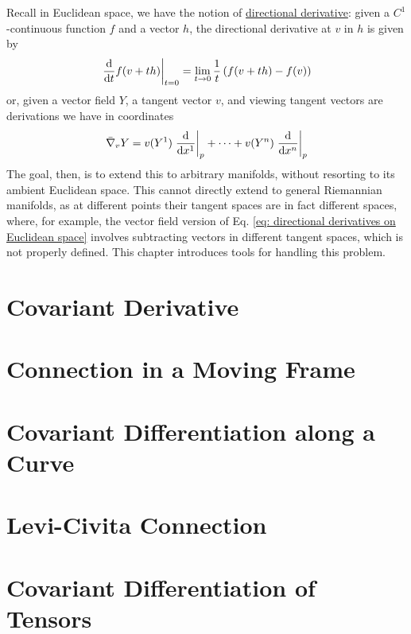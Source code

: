 \documentclass{article}
\begin{document}

\tableofcontents
\newpage

\textstart
Recall in Euclidean space, we have the notion of \underline{directional derivative}: given a $C^1$-continuous function $f$ and a vector $h$, the directional derivative at $v$ in $h$ is given by
\begin{equation}\label{eq: directional derivatives on Euclidean space}
    \left.\frac{\mathrm{d}}{\mathrm{d} t} f(v + th)\right|_{t = 0} = \lim_{t \to 0} \frac{1}{t} \left( f(v + th) - f(v) \right)
\end{equation}
or, given a vector field $Y$, a tangent vector $v$, and viewing tangent vectors are derivations we have in coordinates
\[
    \bar{\nabla}_v Y = v(Y^1) \left.\frac{\mathrm{d}}{\mathrm{d} x^1}\right|_{p} + \cdots + v(Y^n) \left.\frac{\mathrm{d}}{\mathrm{d} x^n}\right|_{p}
\]
The goal, then, is to extend this to arbitrary manifolds, without resorting to its ambient Euclidean space. This cannot directly extend to general Riemannian manifolds, as at different points their tangent spaces are in fact different spaces, where, for example, the vector field version of Eq. \eqref{eq: directional derivatives on Euclidean space} involves subtracting vectors in different tangent spaces, which is not properly defined. This chapter introduces tools for handling this problem.

\section{Covariant Derivative}

\section{Connection in a Moving Frame}

\section{Covariant Differentiation along a Curve}

\section{Levi-Civita Connection}

\section{Covariant Differentiation of Tensors}
\end{document}
